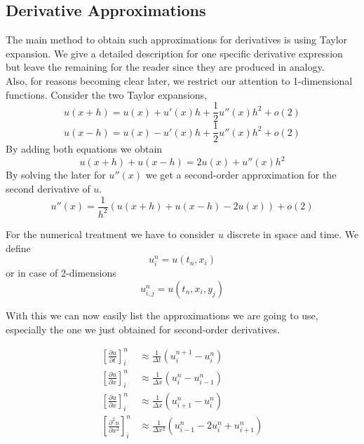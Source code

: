 \documentclass[]{article}
\begin{document}
\subsection{Derivative Approximations}
The main method to obtain such approximations for derivatives is using Taylor expansion.
We give a detailed description for one specific derivative expression but leave the remaining for the reader since they are produced in analogy.\\
Also, for reasons becoming clear later, we restrict our attention to 1-dimensional functions.
Consider the two Taylor expansions,
\begin{equation*}
u(x+h)=u(x)+u'(x)h+\frac{1}{2}u''(x)h^2+o(2)
\end{equation*}
\begin{equation*}
u(x-h)=u(x)-u'(x)h+\frac{1}{2}u''(x)h^2+o(2)
\end{equation*}
By adding both equations we obtain
\begin{equation*}
u(x+h)+u(x-h)=2u(x)+u''(x)h^2
\end{equation*}
By solving the later for $u''(x)$ we get a second-order approximation for the second derivative
of $u$.
\begin{equation*} 
u''(x)=\frac{1}{h^2}(u(x+h)+u(x-h)-2u(x)) + o(2)
\end{equation*}

For the numerical treatment we have to consider $u$ discrete in space and time.
We define 
\begin{equation*}
u_{i}^{n}=u(t_{n}, x_{i})
\end{equation*}
or in case of 2-dimensions
\begin{equation*}
u_{i,j}^{n}=u(t_{n}, x_{i}, y_{j})
\end{equation*}

With this we can now easily list the approximations we are going to use, especially the one
we just obtained for second-order derivatives.

\begin{eqnarray}
	\left[\frac{\partial u}{\partial t}\right]_{i}^{n} & \approx \frac{1}{\Delta t}(u_{i}^{n+1}-u_{i}^{n}) \nonumber  \\
	\left[\frac{\partial u}{\partial x}\right]_{i}^{n} & \approx \frac{1}{\Delta x}(u_{i}^{n}-u_{i-1}^{n})  \label{backward_in_space} \\
	\left[\frac{\partial u}{\partial x}\right]_{i}^{n} & \approx \frac{1}{\Delta x}(u_{i+1}^{n}-u_{i}^{n}) \label{forward_in_space}  \\
	\left[\frac{\partial^2 u}{\partial x^2}\right]_{i}^{n} & \approx
	\frac{1}{\Delta x^2}(u_{i-1}^{n}-2u_{i}^{n}+u_{i+1}^{n}) \nonumber
\end{eqnarray}
\end{document}
